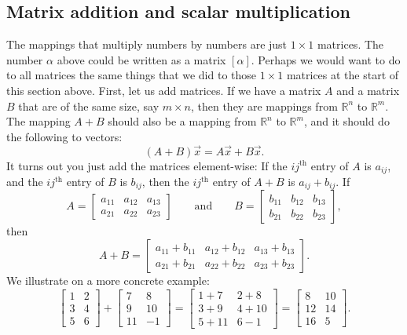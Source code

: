 \subsection{Matrix addition and scalar multiplication}

The mappings that multiply numbers by numbers are just $1 \times 1$ matrices.  The
number $\alpha$ above could be written as a matrix $[\alpha]$.
Perhaps we would want to do to all matrices the same things that we
did to those $1 \times 1$ matrices at the start of this section above.
First, let us add matrices.
If we have a matrix $A$ and a matrix $B$ that are of the same size,
say $m \times n$, then they are mappings from
${\mathbb{R}}^n$ to ${\mathbb{R}}^m$.  The mapping $A+B$ should also be a mapping from
${\mathbb{R}}^n$ to ${\mathbb{R}}^m$, and it should do the following to
vectors:
\begin{equation*}
(A+B) \vec{x} = A\vec{x} + B \vec{x} .
\end{equation*}
It turns out you just add the matrices element-wise:  If the
$ij^{\text{th}}$ entry of $A$ is $a_{ij}$, and the
$ij^{\text{th}}$ entry of $B$ is $b_{ij}$, then the
$ij^{\text{th}}$ entry of $A+B$ is $a_{ij} + b_{ij}$.  If
\begin{equation*}
A = 
\begin{bmatrix}
a_{11} & a_{12} & a_{13}  \\
a_{21} & a_{22} & a_{23}
\end{bmatrix}
\qquad \text{and} \qquad
B = 
\begin{bmatrix}
b_{11} & b_{12} & b_{13}  \\
b_{21} & b_{22} & b_{23}
\end{bmatrix} ,
\end{equation*}
then
\begin{equation*}
A+B = 
\begin{bmatrix}
a_{11} + b_{11} & a_{12} + b_{12} & a_{13} + b_{13}  \\
a_{21} + b_{21} & a_{22} + b_{22} & a_{23} + b_{23}
\end{bmatrix} .
\end{equation*}
We illustrate on a more concrete example:
\begin{equation*}
\begin{bmatrix}
1 & 2 \\
3 & 4 \\
5 & 6
\end{bmatrix}
+
\begin{bmatrix}
7 & 8 \\
9 & 10 \\
11 & -1
\end{bmatrix}
=
\begin{bmatrix}
1+7 & 2+8 \\
3+9 & 4+10 \\
5+11 & 6-1
\end{bmatrix}
=
\begin{bmatrix}
8 & 10 \\
12 & 14 \\
16 & 5
\end{bmatrix} .
\end{equation*}
